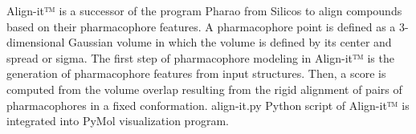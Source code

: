 Align-it™ is a successor of the program Pharao \cite{Taminau_2008} from Silicos to align compounds based on their pharmacophore features. A pharmacophore point is defined as a 3-dimensional Gaussian volume in which the volume is defined by its center and spread or sigma.
The first step of pharmacophore modeling in Align-it™ is the generation of pharmacophore features from input structures. Then, a score is computed from the volume overlap resulting from the rigid alignment of pairs of pharmacophores in a fixed conformation. align-it.py Python script of Align-it™ is integrated into PyMol visualization program.
